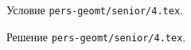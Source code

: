 \problem
Условие \texttt{pers-geomt/senior/4.tex}.

\solution Решение \texttt{pers-geomt/senior/4.tex}.
\endproblem
